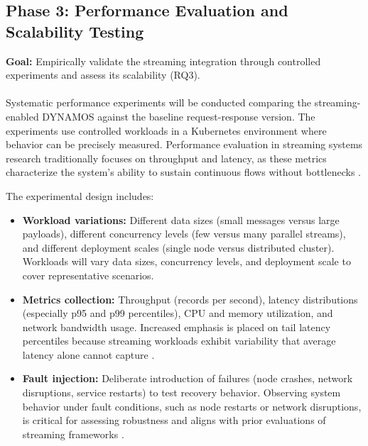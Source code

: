 \documentclass[a4paper,10pt,british]{scrartcl}
\begin{document}
\subsection{Phase 3: Performance Evaluation and Scalability Testing}

\textbf{Goal:} Empirically validate the streaming integration through controlled experiments and assess its scalability (RQ3).

\paragraph{}

Systematic performance experiments will be conducted comparing the streaming-enabled DYNAMOS against the baseline request-response version. The experiments use controlled workloads in a Kubernetes environment where behavior can be precisely measured. Performance evaluation in streaming systems research traditionally focuses on throughput and latency, as these metrics characterize the system's ability to sustain continuous flows without bottlenecks \cite{karimov2018benchmarking,pour2025performance}.

The experimental design includes:

\begin{itemize}
  \item \textbf{Workload variations:} Different data sizes (small messages versus large payloads), different concurrency levels (few versus many parallel streams), and different deployment scales (single node versus distributed cluster). Workloads will vary data sizes, concurrency levels, and deployment scale to cover representative scenarios.
  \item \textbf{Metrics collection:} Throughput (records per second), latency distributions (especially p95 and p99 percentiles), CPU and memory utilization, and network bandwidth usage. Increased emphasis is placed on tail latency percentiles because streaming workloads exhibit variability that average latency alone cannot capture \cite{karimov2018benchmarking}.
  \item \textbf{Fault injection:} Deliberate introduction of failures (node crashes, network disruptions, service restarts) to test recovery behavior. Observing system behavior under fault conditions, such as node restarts or network disruptions, is critical for assessing robustness and aligns with prior evaluations of streaming frameworks \cite{vogel2024faultRecovery}.
\end{itemize}
\end{document}
